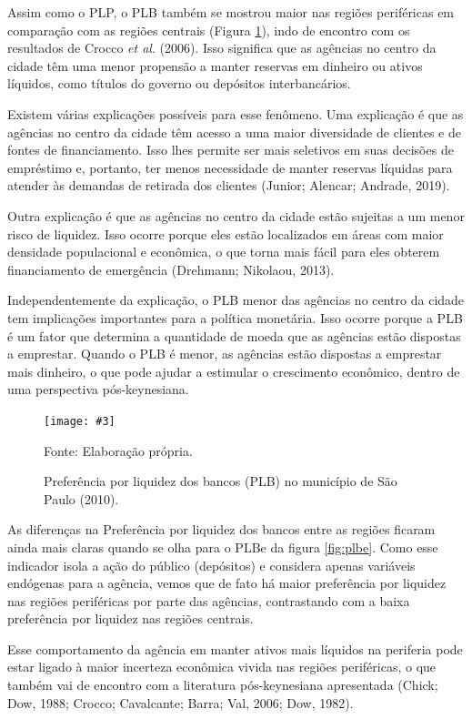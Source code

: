\documentclass[a4paper,12pt]{article}
\newcommand{\fig}[4]{%
  \begin{figure}[H]
    \centering
    \caption{#1}
    \label{#2}
    \texttt{[image: \#3]}
    
    \vspace{0.5cm}
    
    \begin{footnotesize}
      Fonte: #4
    \end{footnotesize}
  \end{figure}
}
\begin{document}
Assim como o PLP, o PLB também se mostrou maior nas regiões periféricas
em comparação com as regiões centrais (Figura \ref{fig:plb}), indo de
encontro com os resultados de Crocco \emph{et al}. (2006). Isso
significa que as agências no centro da cidade têm uma menor propensão a
manter reservas em dinheiro ou ativos líquidos, como títulos do governo
ou depósitos interbancários.

Existem várias explicações possíveis para esse fenômeno. Uma explicação
é que as agências no centro da cidade têm acesso a uma maior diversidade
de clientes e de fontes de financiamento. Isso lhes permite ser mais
seletivos em suas decisões de empréstimo e, portanto, ter menos
necessidade de manter reservas líquidas para atender às demandas de
retirada dos clientes (Junior; Alencar; Andrade, 2019).

Outra explicação é que as agências no centro da cidade estão sujeitas a
um menor risco de liquidez. Isso ocorre porque eles estão localizados em
áreas com maior densidade populacional e econômica, o que torna mais
fácil para eles obterem financiamento de emergência (Drehmann; Nikolaou,
2013).

Independentemente da explicação, o PLB menor das agências no centro da
cidade tem implicações importantes para a política monetária. Isso
ocorre porque a PLB é um fator que determina a quantidade de moeda que
as agências estão dispostas a emprestar. Quando o PLB é menor, as
agências estão dispostas a emprestar mais dinheiro, o que pode ajudar a
estimular o crescimento econômico, dentro de uma perspectiva
pós-keynesiana.

\fig{Preferência por liquidez dos bancos (PLB) no município de São Paulo (2010).}{fig:plb}{exports/plb2.pdf}{Elaboração própria.}

As diferenças na Preferência por liquidez dos bancos entre as regiões
ficaram ainda mais claras quando se olha para o PLBe da figura
\ref{fig:plbe}. Como esse indicador isola a ação do público (depósitos)
e considera apenas variáveis endógenas para a agência, vemos que de fato
há maior preferência por liquidez nas regiões periféricas por parte das
agências, contrastando com a baixa preferência por liquidez nas regiões
centrais.

Esse comportamento da agência em manter ativos mais líquidos na
periferia pode estar ligado à maior incerteza econômica vivida nas
regiões periféricas, o que também vai de encontro com a literatura
pós-keynesiana apresentada (Chick; Dow, 1988; Crocco; Cavalcante; Barra;
Val, 2006; Dow, 1982).
\end{document}
